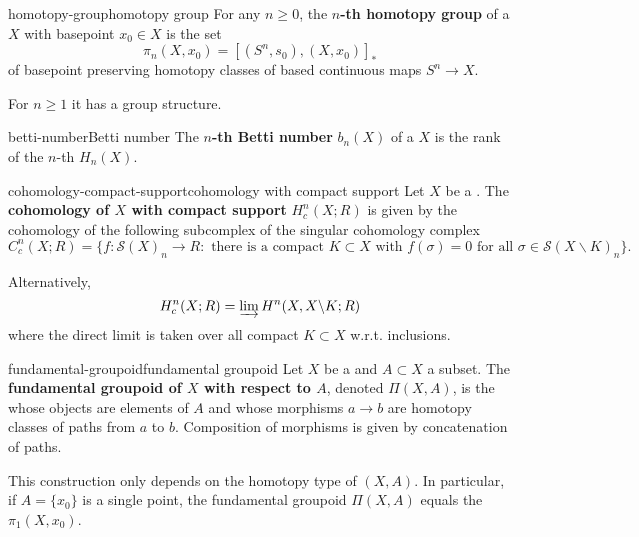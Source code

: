 \begin{topic}{homotopy-group}{homotopy group}
    For any $n \ge 0$, the \textbf{$n$-th homotopy group} of a  $X$ with basepoint $x_0 \in X$ is the set
    \[ \pi_n(X, x_0) = [(S^n, s_0), (X, x_0)]_* \]
    of basepoint preserving homotopy classes of based continuous maps $S^n \to X$.
    
    For $n \ge 1$ it has a group structure.
\end{topic}

\begin{topic}{betti-number}{Betti number}
    The \textbf{$n$-th Betti number} $b_n(X)$ of a  $X$ is the rank of the $n$-th  $H_n(X)$.
\end{topic}

\begin{topic}{cohomology-compact-support}{cohomology with compact support}
    Let $X$ be a . The \textbf{cohomology of $X$ with compact support} $H_c^n(X; R)$ is given by the cohomology of the following subcomplex of the singular cohomology complex
    \[ C_c^n(X; R) = \big\{ f : \mathcal{S}(X)_n \to R : \text{ there is a compact $K \subset X$ with $f(\sigma) = 0$ for all $\sigma \in \mathcal{S}(X \backslash K)_n$} \big\} . \]
    
    Alternatively,
    \[ H_c^n(X; R) = \varinjlim H^n(X, X \backslash K; R) \]
    where the direct limit is taken over all compact $K \subset X$ w.r.t. inclusions.
\end{topic}

\begin{topic}{fundamental-groupoid}{fundamental groupoid}
    Let $X$ be a  and $A \subset X$ a subset. The \textbf{fundamental groupoid of $X$ with respect to $A$}, denoted $\Pi(X, A)$, is the  whose objects are elements of $A$ and whose morphisms $a \to b$ are homotopy classes of paths from $a$ to $b$. Composition of morphisms is given by concatenation of paths.
    
    This construction only depends on the homotopy type of $(X, A)$. In particular, if $A = \{ x_0 \}$ is a single point, the fundamental groupoid $\Pi(X, A)$ equals the  $\pi_1(X, x_0)$.
\end{topic}

